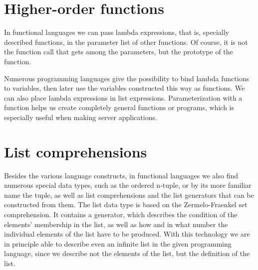 \documentclass[margin=0px]{article}
\begin{document}
\section{Higher-order functions}
In functional languages we can pass lambda expressions, that is, specially described functions, in the parameter list of other functions. Of course, it is not the function call that gets among the parameters, but the prototype of the function.

Numerous programming languages give the possibility to bind lambda functions to variables, then later use the variables constructed this way as functions. We can also place lambda expressions in list expressions. Parameterization with a function helps us create completely general functions or programs, which is especially useful when making server applications.

\section{List comprehensions}
Besides the various language constructs, in functional languages we also find numerous special data types, such as the ordered n-tuple, or by its more familiar name the tuple, as well as list comprehensions and the list generators that can be constructed from them. The list data type is based on the Zermelo-Fraenkel set comprehension. It contains a generator, which describes the condition of the elements' membership in the list, as well as how and in what number the individual elements of the list have to be produced. With this technology we are in principle able to describe even an infinite list in the given programming language, since we describe not the elements of the list, but the definition of the list.
\end{document}
